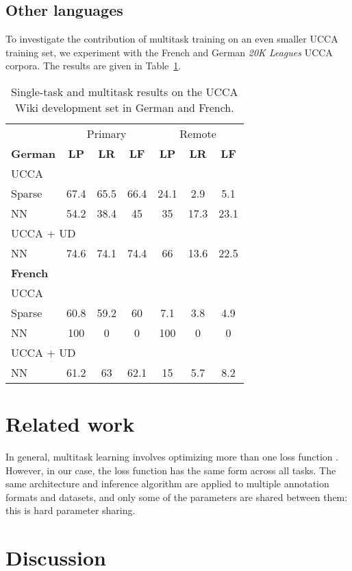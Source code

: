 \documentclass[11pt,a4paper]{article}
\begin{document}
\subsection{Other languages}\label{sec:other_languages}

To investigate the contribution of multitask training on an even smaller UCCA training set,
we experiment with the French and German \textit{20K Leagues} UCCA corpora.
The results are given in Table~\ref{tab:other_languages}.

\begin{table}
\begin{tabular}{lccc|ccc}
& \multicolumn{3}{c|}{Primary} & \multicolumn{3}{c}{Remote} \\
\textbf{German} & \textbf{LP} & \textbf{LR} & \textbf{LF} & \textbf{LP} & \textbf{LR} & \textbf{LF} \\
UCCA \\
\small Sparse & 67.4 & 65.5 & 66.4 & 24.1 & 2.9 & 5.1 \\
\small NN & 54.2 & 38.4 & 45 & 35 & 17.3 & 23.1 \\
\multicolumn{3}{l}{UCCA + UD} \\
\small NN & 74.6 & 74.1 & 74.4 & 66 & 13.6 & 22.5 \\
\hline
\textbf{French} \\
UCCA \\
\small Sparse & 60.8 & 59.2 & 60 & 7.1 & 3.8 & 4.9 \\
\small NN & 100 & 0 & 0 & 100 & 0 & 0 \\
\multicolumn{3}{l}{UCCA + UD} \\
\small NN & 61.2 & 63 & 62.1 & 15 & 5.7 & 8.2
\end{tabular}
\caption{Single-task and multitask results on the UCCA Wiki development set in German and French.\label{tab:other_languages}}
\end{table}



\section{Related work}\label{sec:related_work}

In general, multitask learning involves optimizing more than one loss function \cite{ruder2017overview}.
However, in our case, the loss function has the same form across all tasks.
The same architecture and inference algorithm are applied to multiple annotation formats and datasets,
and only some of the parameters are shared between them: this is hard parameter sharing.

\cite{swayamdipta2017frame}
\cite{P17-1186}


\section{Discussion}\label{sec:discussion}






\end{document}
